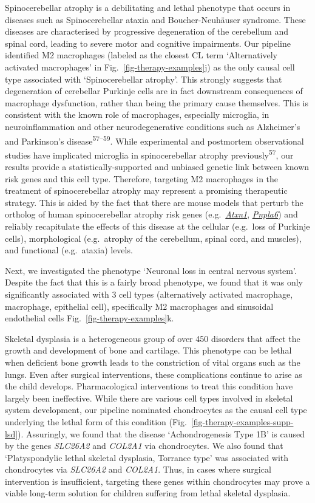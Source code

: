 \documentclass[
]{article}
\begin{document}
Spinocerebellar atrophy is a debilitating and lethal phenotype that
occurs in diseases such as Spinocerebellar ataxia and Boucher-Neuhäuser
syndrome. These diseases are characterised by progressive degeneration
of the cerebellum and spinal cord, leading to severe motor and cognitive
impairments. Our pipeline identified M2 macrophages (labeled as the
closest CL term `Alternatively activated macrophages' in
Fig.~\ref{fig-therapy-examples}j) as the only causal cell type
associated with `Spinocerebellar atrophy'. This strongly suggests that
degeneration of cerebellar Purkinje cells are in fact downstream
consequences of macrophage dysfunction, rather than being the primary
cause themselves. This is consistent with the known role of macrophages,
especially microglia, in neuroinflammation and other neurodegenerative
conditions such as Alzheimer's and Parkinson's
disease\textsuperscript{57--59}. While experimental and postmortem
observational studies have implicated microglia in spinocerebellar
atrophy previously\textsuperscript{57}, our results provide a
statistically-supported and unbiased genetic link between known risk
genes and this cell type. Therefore, targeting M2 macrophages in the
treatment of spinocerebellar atrophy may represent a promising
therapeutic strategy. This is aided by the fact that there are mouse
models that perturb the ortholog of human spinocerebellar atrophy risk
genes
(e.g.~\href{https://www.informatics.jax.org/marker/MGI:104783}{\emph{Atxn1}},
\href{https://www.informatics.jax.org/marker/MGI:1354723}{\emph{Pnpla6}})
and reliably recapitulate the effects of this disease at the cellular
(e.g.~loss of Purkinje cells), morphological (e.g.~atrophy of the
cerebellum, spinal cord, and muscles), and functional (e.g.~ataxia)
levels.

Next, we investigated the phenotype `Neuronal loss in central nervous
system'. Despite the fact that this is a fairly broad phenotype, we
found that it was only significantly associated with 3 cell types
(alternatively activated macrophage, macrophage, epithelial cell),
specifically M2 macrophages and sinusoidal endothelial cells
Fig.~\ref{fig-therapy-examples}k.

Skeletal dysplasia is a heterogeneous group of over 450 disorders that
affect the growth and development of bone and cartilage. This phenotype
can be lethal when deficient bone growth leads to the constriction of
vital organs such as the lungs. Even after surgical interventions, these
complications continue to arise as the child develops. Pharmacological
interventions to treat this condition have largely been ineffective.
While there are various cell types involved in skeletal system
development, our pipeline nominated chondrocytes as the causal cell type
underlying the lethal form of this condition
(Fig.~\ref{fig-therapy-examples-supp-lsd}). Assuringly, we found that
the disease `Achondrogenesis Type 1B' is caused by the genes
\emph{SLC26A2} and \emph{COL2A1} via chondrocytes. We also found that
`Platyspondylic lethal skeletal dysplasia, Torrance type' was associated
with chondrocytes via \emph{SLC26A2} and \emph{COL2A1}. Thus, in cases
where surgical intervention is insufficient, targeting these genes
within chondrocytes may prove a viable long-term solution for children
suffering from lethal skeletal dysplasia.
\end{document}
